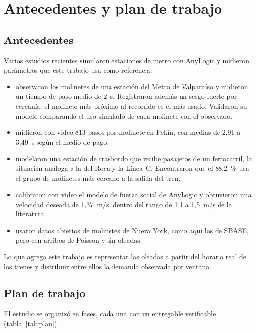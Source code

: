 \section{Antecedentes y plan de trabajo}
\label{anx:antecedentes}

\subsection{Antecedentes}

Varios estudios recientes simularon estaciones de metro con AnyLogic y midieron parámetros que este
trabajo usa como referencia.
\begin{itemize}
  \item \textcite{seriani2025} observaron los molinetes de una estación del Metro de Valparaíso y midieron
        un tiempo de paso medio de 2~s. Registraron además un sesgo fuerte por cercanía: el molinete
        más próximo al recorrido es el más usado. Validaron su modelo comparando el uso simulado de cada
        molinete con el observado.
  \item \textcite{wang2024} midieron con video 813 pasos por molinete en Pekín, con medias de 2,91 a 3,49~s
        según el medio de pago.
  \item \textcite{tian2026} modelaron una estación de trasbordo que recibe pasajeros de un ferrocarril, la
        situación análoga a la del Roca y la Línea~C. Encontraron que el 88,2~\% usa el grupo de molinetes
        más cercano a la salida del tren.
  \item \textcite{li2024} calibraron con video el modelo de fuerza social de AnyLogic y obtuvieron una
        velocidad deseada de 1,37~m/s, dentro del rango de 1,1 a 1,5~m/s de la literatura.
  \item \textcite{zhen2024} usaron datos abiertos de molinetes de Nueva York, como aquí los de SBASE, pero
        con arribos de Poisson y sin oleadas.
\end{itemize}
Lo que agrega este trabajo es representar las oleadas a partir del horario real de los trenes y
distribuir entre ellos la demanda observada por ventana.

\subsection{Plan de trabajo}
\label{anx:plan}

El estudio se organizó en fases, cada una con un entregable verificable (tabla~\ref{tab:plan}).

